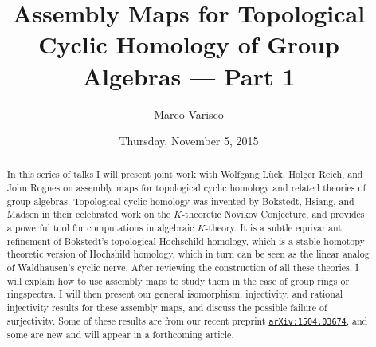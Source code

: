 \documentclass{UAmathtalk}
\author{Marco Varisco}
\title{Assembly Maps for Topological Cyclic Homology of Group Algebras --- Part 1}
\date{Thursday, November 5, 2015}
\begin{document}
\maketitle

\begin{abstract}
In this series of talks I will present joint work with Wolfgang Lück, Holger Reich, and John Rognes on assembly maps for topological cyclic homology and related theories of group algebras.
Topological cyclic homology was invented by Bökstedt, Hsiang, and Madsen in their celebrated work on the $K$-theoretic Novikov Conjecture, and provides a powerful tool for computations in algebraic $K$-theory.
It is a subtle equivariant refinement of Bökstedt's topological Hochschild homology, which is a stable homotopy theoretic version of Hochshild homology, which in turn can be seen as the linear analog of Waldhausen's cyclic nerve.
After reviewing the construction of all these theories, I will explain how to use assembly maps to study them in the case of group rings or ringspectra.
I will then present our general isomorphism, injectivity, and rational injectivity results for these assembly maps, and discuss the possible failure of surjectivity.
Some of these results are from our recent preprint \href{http://www.arxiv.org/abs/1504.03674/}{\texttt{arXiv:1504.03674}}, and some are new and will appear in a forthcoming article.
\end{abstract}
\end{document}
